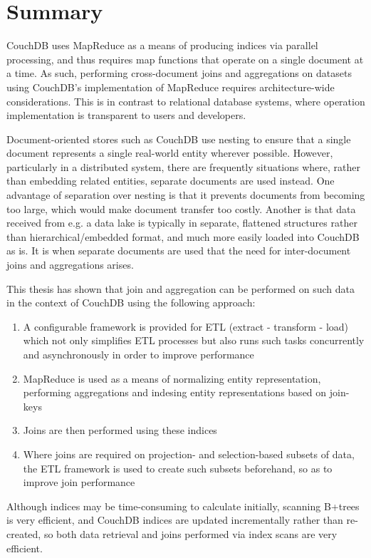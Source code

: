 \section{Summary}
CouchDB uses MapReduce as a means of producing indices via parallel processing, and thus requires map functions that operate on a single document at a time. As such, performing cross-document joins and aggregations on datasets using CouchDB's implementation of MapReduce requires architecture-wide considerations. This is in contrast to relational database systems, where operation implementation is transparent to users and developers.

Document-oriented stores such as CouchDB use nesting to ensure that a single document represents a single real-world entity wherever possible. However, particularly in a distributed system, there are frequently situations where, rather than embedding related entities, separate documents are used instead. One advantage of separation over nesting is that it prevents documents from becoming too large, which would make document transfer too costly. Another is that data received from e.g. a data lake is typically in separate, flattened structures rather than hierarchical/embedded format, and much more easily loaded into CouchDB as is. It is when separate documents are used that the need for inter-document joins and aggregations arises.

This thesis has shown that join and aggregation can be performed on such data in the context of CouchDB using the following approach:

\begin{enumerate}
    \item A configurable framework is provided for ETL (extract - transform - load) which not only simplifies ETL processes but also runs such tasks concurrently and asynchronously in order to improve performance
    \item MapReduce is used as a means of normalizing entity representation, performing aggregations and indesing entity representations based on join-keys
    \item Joins are then performed using these indices
    \item Where joins are required on projection- and selection-based subsets of data, the ETL framework is used to create such subsets beforehand, so as to improve join performance
\end{enumerate}

Although indices may be time-consuming to calculate initially, scanning B+trees is very efficient, and CouchDB indices are updated incrementally rather than re-created, so both data retrieval and joins performed via index scans are very efficient.

